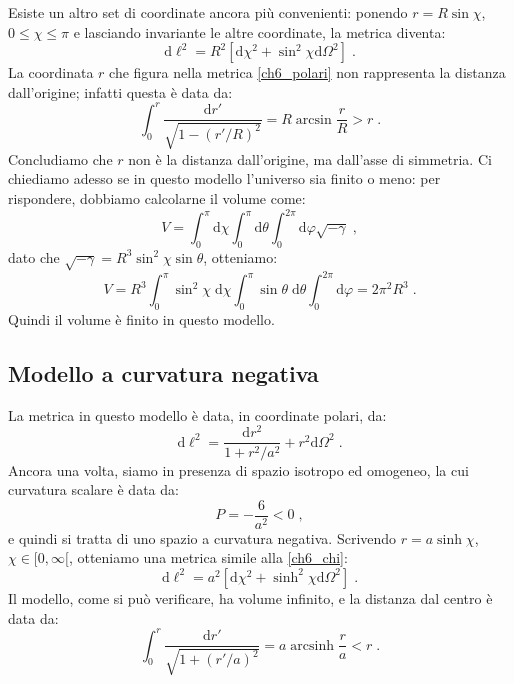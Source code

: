 \documentclass[12pt,a4paper]{report}
\theoremstyle{definition}
\newcommand{\diff}[1][]{\mathrm{d}#1}
\begin{document}
Esiste un altro set di coordinate ancora più convenienti: ponendo $r=R\sin\chi$, $0\le \chi\le \pi$ e lasciando invariante le altre coordinate, la metrica diventa:
\begin{equation}
\diff{\ell}^2=R^2\left[\diff{\chi}^2+\sin^2\chi\diff{\Omega}^2\right]\;. \label{ch6_chi}
\end{equation}
La coordinata $r$ che figura nella metrica \eqref{ch6_polari} non rappresenta la distanza dall'origine; infatti questa è data da:
$$
\int_0^r\frac{\diff{r'}}{\sqrt{1-(r'/R)^2}}=R\arcsin\frac{r}{R}>r\;.
$$
Concludiamo che $r$ non è la distanza dall'origine, ma dall'asse di simmetria. Ci chiediamo adesso se in questo modello l'universo sia finito o meno: per rispondere, dobbiamo calcolarne il volume come:
\begin{equation}
V=\int_0^{\pi}\diff{\chi}\int_0^{\pi}\diff{\theta}\int_0^{2\pi}\diff{\varphi}\sqrt{-\gamma}\;,
\end{equation}
dato che $\sqrt{-\gamma}=R^3\sin^2\chi\sin\theta$, otteniamo:
\begin{equation}
V=R^3\int_0^{\pi}\sin^2\chi\;\diff{\chi}\int_0^{\pi}\sin\theta\;\diff{\theta}\int_0^{2\pi}\diff{\varphi}=2\pi^2R^3\;.
\end{equation}
Quindi il volume è finito in questo modello.
\subsection{Modello a curvatura negativa}
La metrica in questo modello è data, in coordinate polari, da:
\begin{equation}
\diff{\ell}^2=\frac{\diff{r}^2}{1+r^2/a^2}+r^2\diff{\Omega}^2\;.
\end{equation}
Ancora una volta, siamo in presenza di spazio isotropo ed omogeneo, la cui curvatura scalare è data da:
\begin{equation}
P=-\frac{6}{a^2}<0\;,
\end{equation}
e quindi si tratta di uno spazio a curvatura negativa. Scrivendo $r=a\sinh\chi$, $\chi\in [0,\infty[$, otteniamo una metrica simile alla \eqref{ch6_chi}:
\begin{equation}
\diff{\ell}^2=a^2[\diff{\chi}^2+\sinh^2\chi\diff{\Omega}^2]\;.
\end{equation}
Il modello, come si può verificare, ha volume infinito, e la distanza dal centro è data da:
$$
\int_0^r\frac{\diff{r'}}{\sqrt{1+(r'/a)^2}}=a\operatorname{arcsinh}\frac{r}{a}<r\;.
$$
\end{document}
